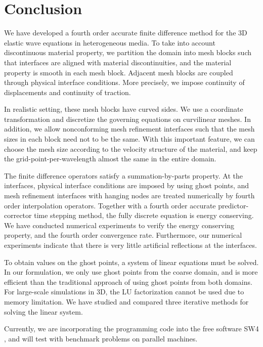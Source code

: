 \section{Conclusion}
We have developed a fourth order accurate finite difference method for the 3D elastic wave equations in heterogeneous media. To take into account discontinuous material property, we partition the domain into mesh blocks such that interfaces are aligned with material discontinuities, and the material property is smooth in each mesh block. Adjacent mesh blocks are coupled through physical interface conditions. More precisely, we impose continuity of displacements and continuity of traction. 

In realistic setting, these mesh blocks have curved sides. We use a coordinate transformation and discretize the governing equations on curvilinear meshes. In addition, we allow nonconforming mesh refinement  interfaces such that the mesh sizes in each block need not to be the same. With this important feature, we can choose the mesh size according to the velocity structure of the material, and keep the grid-point-per-wavelength almost the same in the entire domain. 

The finite difference operators satisfy a summation-by-parts property. At the interfaces, physical interface conditions are imposed by using ghost points, and mesh refinement interfaces with hanging nodes are treated numerically by fourth order interpolation operators. Together with a fourth order accurate predictor-corrector time stepping method, the fully discrete equation is energy conserving. We have conducted numerical experiments to verify the energy conserving property, and the fourth order convergence rate. Furthermore, our numerical experiments indicate that there is very little artificial reflections at the interfaces.

To obtain values on the ghost points, a system of linear equations must be solved. In our formulation, we only use ghost points from the coarse domain, and is more efficient than the traditional approach of using ghost points from both domains.  For large-scale simulations in 3D, the LU factorization cannot be used due to memory limitation. We have studied and compared three iterative methods for solving the linear system.

Currently, we are incorporating the programming code into the free software SW4 \cite{SW4}, and will test with benchmark problems on parallel machines. 